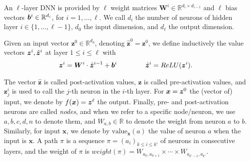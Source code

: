 \documentclass{article} %
\newcommand{\val}{{\textrm{value}}}
\theoremstyle{definition}
\begin{document}



An $\ell$-layer DNN is provided by $\ell$ weight matrices 
$\boldsymbol{W}^i \in \mathbb{R}^{d_i\times d_{i-1}}$
and $\ell$ bias vectors ${\bm{b}}^i \in \mathbb{R}^{d_i}$, for $i=1, \ldots, \ell$.
We call $d_i$ the number of neurons of hidden layer $i \in \{1, \ldots, \ell-1\}$,
$d_0$ the input dimension, and $d_\ell$ the output dimension.

Given an input vector $\boldsymbol{z}^0 \in \mathbb{R}^{d_0}$, 
denoting $\hat{\boldsymbol{z}}^{0}={\boldsymbol{z}}^0$, we define inductively the value vectors $\boldsymbol{z}^i,\hat{{\bm{z}}}^i$ at layer $1 \leq i \leq \ell$ with
\begin{align*}
	\boldsymbol{z}^{i} = \boldsymbol{W}^i\cdot \hat{\boldsymbol{z}}^{i-1}+ {\bm{b}}^i \qquad \, \qquad
	\hat{\boldsymbol{z}}^{i} = ReLU({\boldsymbol{z}}^i).
\end{align*} 

The vector $\hat{\boldsymbol{z}}$ is called post-activation values, 
$\boldsymbol{z}$ is called pre-activation values, 
and $\boldsymbol{z}^{i}_j$ is used to call the $j$-th neuron in the $i$-th layer. 
For $\boldsymbol{x}={\bm{z}}^0$ the (vector of) input, we denote by $f(\boldsymbol{x})={\bm{z}}^\ell$ the output. Finally, pre- and post-activation neurons are called \emph{nodes}, and when we refer to a specific node/neuron, we use $a,b,c,d,n$ to denote them, and $W_{a,b} \in \mathbb{R}$ to denote the weight from neuron $a$ to $b$. Similarly, for input $\boldsymbol{x}$, we denote by $\val_{\boldsymbol{x}}(a)$ the value of neuron $a$ when the input is $\boldsymbol{x}$. A path $\pi$ is a sequence $\pi=(a_i)_{k \leq  i \leq k'}$ of neurons in consecutive layers, and the weight of $\pi$ is 
$weight(\pi)=W_{a_k,a_{k+1}} \times \cdots \times  W_{a_{k'-1},a_{k'}}$.
\end{document}
